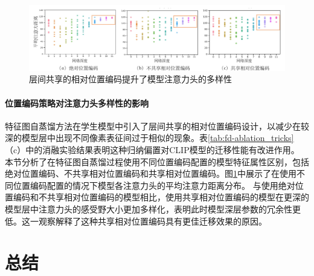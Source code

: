 \begin{figure}
  \centering
  \includegraphics[width=1.0\linewidth]{figures/fd_compare_all_ape_rpe.pdf}
  \caption{层间共享的相对位置编码提升了模型注意力头的多样性}
  \label{fig:fd_compare_all_ape_rpe}
\end{figure}

\paragraph{位置编码策略对注意力头多样性的影响} 特征图自蒸馏方法在学生模型中引入了层间共享的相对位置编码设计，以减少在较深的模型层中出现不同像素表征间过于相似的现象。表\ref{tab:fd-ablation_tricks}（c）中的消融实验结果表明这种归纳偏置对CLIP模型的迁移性能有改进作用。
本节分析了在特征图自蒸馏过程使用不同位置编码配置的模型特征属性区别，包括绝对位置编码、不共享相对位置编码和共享相对位置编码。图\ref{fig:fd_compare_all_ape_rpe}中展示了在使用不同位置编码配置的情况下模型各注意力头的平均注意力距离分布。
与使用绝对位置编码和不共享相对位置编码的模型相比，使用共享相对位置编码的模型在更深的模型层中注意力头的感受野大小更加多样化，表明此时模型深层参数的冗余性更低。这一观察解释了这种共享相对位置编码具有更佳迁移效果的原因。


\section{总结}
\label{sec:fd-summary}



